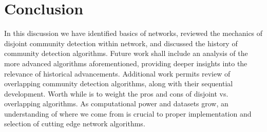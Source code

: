 \documentclass[a4paper, 10pt, twocolumn]{article}
\begin{document}
\section{Conclusion}

In this discussion we have identified basics of networks, reviewed the mechanics of disjoint community detection within network, and discussed the history of community detection algorithms.
Future work shall include an analysis of the more advanced algorithms aforementioned, providing deeper insights into the relevance of historical advancements.
Additional work permits review of overlapping community detection algorithms, along with their sequential development.
Worth while is to weight the pros and cons of disjoint vs. overlapping algorithms.
As computational power and datasets grow, an understanding of where we come from is crucial to proper implementation and selection of cutting edge network algorithms.



{}
\end{document}
